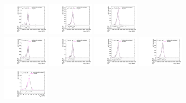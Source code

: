 \begin{figure}[htpb]
  \includegraphics[width=0.2\textwidth]{fig/2Dfit/templateVsReco_VBFWprToWZ2000_r0_MVV_mu_LP_nobb_LDy_linear.pdf}
  \includegraphics[width=0.2\textwidth]{fig/2Dfit/templateVsReco_VBFWprToWZ2000_r0_MVV_mu_HP_nobb_HDy_linear.pdf}
  \includegraphics[width=0.2\textwidth]{fig/2Dfit/templateVsReco_VBFWprToWZ2000_r0_MVV_mu_LP_nobb_HDy_linear.pdf}\\
  \includegraphics[width=0.2\textwidth]{fig/2Dfit/templateVsReco_VBFWprToWZ2000_r0_MVV_mu_HP_vbf_LDy_linear.pdf}
  \includegraphics[width=0.2\textwidth]{fig/2Dfit/templateVsReco_VBFWprToWZ2000_r0_MVV_mu_LP_vbf_LDy_linear.pdf}
  \includegraphics[width=0.2\textwidth]{fig/2Dfit/templateVsReco_VBFWprToWZ2000_r0_MVV_mu_HP_vbf_HDy_linear.pdf}
  \includegraphics[width=0.2\textwidth]{fig/2Dfit/templateVsReco_VBFWprToWZ2000_r0_MVV_mu_LP_vbf_HDy_linear.pdf}\\
  \includegraphics[width=0.2\textwidth]{fig/2Dfit/templateVsReco_VBFWprToWZ2000_r0_MJ_mu_HP_bb_LDy.pdf}

\end{figure}
